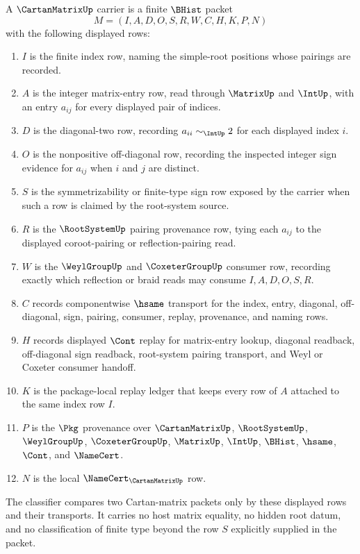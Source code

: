 \begin{definition}
\label{def:cartan-matrix-carrier}
A $\CartanMatrixUp$ carrier is a finite $\BHist$ packet
$$
M=(I,A,D,O,S,R,W,C,H,K,P,N)
$$
with the following displayed rows:
\begin{enumerate}
\item $I$ is the finite index row, naming the simple-root positions whose pairings are recorded.
\item $A$ is the integer matrix-entry row, read through $\MatrixUp$ and $\IntUp$, with an entry $a_{ij}$ for every displayed pair of indices.
\item $D$ is the diagonal-two row, recording $a_{ii}\sim_{\IntUp}2$ for each displayed index $i$.
\item $O$ is the nonpositive off-diagonal row, recording the inspected integer sign evidence for $a_{ij}$ when $i$ and $j$ are distinct.
\item $S$ is the symmetrizability or finite-type sign row exposed by the carrier when such a row is claimed by the root-system source.
\item $R$ is the $\RootSystemUp$ pairing provenance row, tying each $a_{ij}$ to the displayed coroot-pairing or reflection-pairing read.
\item $W$ is the $\WeylGroupUp$ and $\CoxeterGroupUp$ consumer row, recording exactly which reflection or braid reads may consume $I,A,D,O,S,R$.
\item $C$ records componentwise $\hsame$ transport for the index, entry, diagonal, off-diagonal, sign, pairing, consumer, replay, provenance, and naming rows.
\item $H$ records displayed $\Cont$ replay for matrix-entry lookup, diagonal readback, off-diagonal sign readback, root-system pairing transport, and Weyl or Coxeter consumer handoff.
\item $K$ is the package-local replay ledger that keeps every row of $A$ attached to the same index row $I$.
\item $P$ is the $\Pkg$ provenance over $\CartanMatrixUp$, $\RootSystemUp$, $\WeylGroupUp$, $\CoxeterGroupUp$, $\MatrixUp$, $\IntUp$, $\BHist$, $\hsame$, $\Cont$, and $\NameCert$.
\item $N$ is the local $\NameCert_{\CartanMatrixUp}$ row.
\end{enumerate}
The classifier compares two Cartan-matrix packets only by these displayed rows and their transports. It carries no host matrix equality, no hidden root datum, and no classification of finite type beyond the row $S$ explicitly supplied in the packet.
\end{definition}

